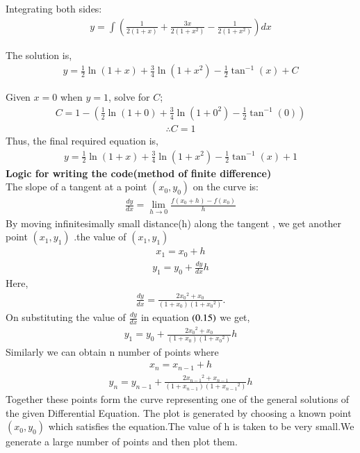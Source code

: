 \documentclass[journal]{IEEEtran}
\begin{document}
Integrating both sides:
\begin{align}
    y = \int \left(\frac{1}{2(1+x)} + \frac{3x}{2(1+x^2)} - \frac{1}{2(1+x^2)}\right) dx
\end{align}

The solution is,
\begin{align}
    y = \frac{1}{2} \ln(1+x) + \frac{3}{4} \ln(1+x^2) - \frac{1}{2} \tan^{-1}(x) + C
\end{align}

Given $x = 0$ when $y = 1$, solve for $C$;
\begin{align}
C = 1 - \left(\frac{1}{2} \ln(1+0) + \frac{3}{4} \ln(1+0^2) - \frac{1}{2} \tan^{-1}(0)\right)
\end{align}
\begin{align}
    \therefore C = 1
\end{align}
Thus, the final required equation is,
\begin{align}   
y = \frac{1}{2} \ln(1+x) + \frac{3}{4} \ln(1+x^2) - \frac{1}{2} \tan^{-1}(x) + 1
\end{align}
\textbf{Logic for writing the code(method of finite difference)}
\\
The slope of a tangent at a point $(x_0, y_0)$ on the curve is: 
\begin{align} 
\frac{dy}{dx} = \lim_{h \to 0} \frac{f(x_0 + h) - f(x_0)}{h}
\end{align}
By moving infinitesimally small distance(h) along the tangent , we get another point $(x_1, y_1)$ .the value of $(x_1,y_1)$
\begin{align}
x_1=x_0+h
\end{align}
\begin{align}
y_1=y_0+\frac{dy}{dx}h
\end{align}
Here,
\begin{align}
    \frac{dy}{dx}=\frac{2{x_0}^2 + {x_0}}{(1+{x_0})(1+{x_0}^2)}.
\end{align}
On substituting the value of $\frac{dy}{dx}$ in equation $\left(0.15\right)$ we get,
\begin{align}  
y_1=y_0+{\frac{2{x_0}^2 + {x_0}}{(1+{x_0})(1+{x_0}^2)}}h
\end{align}
Similarly we can obtain n number of points where 
\begin{align}
    x_n=x_{n-1}+h 
\end{align}
\begin{align}
    y_n=y_{n-1}+{\frac{2{x_{n-1}}^2 + x_{n-1}}{(1+{x_{n-1}})(1+{x_{n-1}}^2)}}h
\end{align}
 Together these points form the curve representing one of the general solutions of the given Differential Equation. The plot is generated by choosing a known point $(x_0, y_0)$ which satisfies the equation.The value of h is taken to be very small.We generate a large number of points and then plot them.
\end{document}
